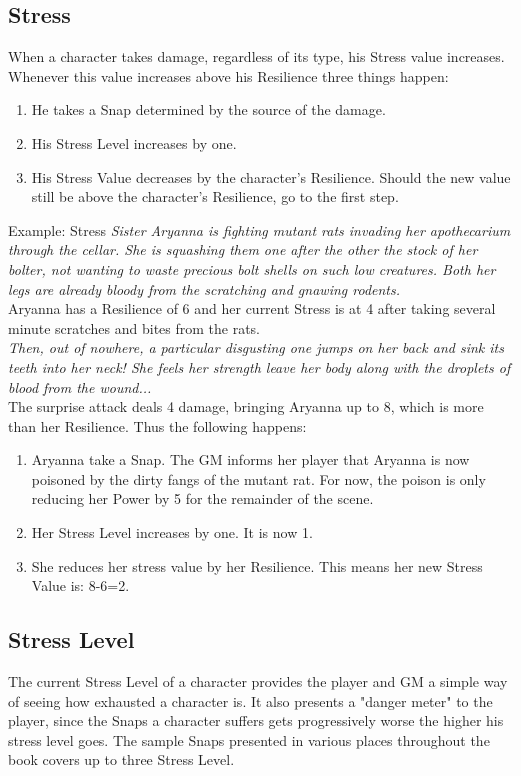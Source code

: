 \subsection{Stress}\label{Stress}
When a character takes damage, regardless of its type, his Stress value increases.
Whenever this value increases above his Resilience three things happen:
\begin{enumerate}
	\item He takes a Snap determined by the source of the damage.
	\item His Stress Level increases by one.
	\item His Stress Value decreases by the character's Resilience. Should the new value still be above the character's Resilience, go to the first step.
\end{enumerate}

\begin{DndSidebar}{Example: Stress}
\textit{Sister Aryanna is fighting mutant rats invading her apothecarium through the cellar. She is squashing them one after the other the stock of her bolter, not wanting to waste precious bolt shells on such low creatures. Both her legs are already bloody from the scratching and gnawing rodents.}\\
\noindent
Aryanna has a Resilience of 6 and her current Stress is at 4 after taking several minute scratches and bites from the rats.\\
\noindent
\textit{Then, out of nowhere, a particular disgusting one jumps on her back and sink its teeth into her neck! She feels her strength leave her body along with the droplets of blood from the wound...}\\
\noindent
The surprise attack deals 4 damage, bringing Aryanna up to 8, which is more than her Resilience. 
Thus the following happens:
\begin{enumerate}
	\item Aryanna take a Snap. The GM informs her player that Aryanna is now poisoned by the dirty fangs of the mutant rat. For now, the poison is only reducing her Power by 5 for the remainder of the scene.
	\item Her Stress Level increases by one. It is now 1.
	\item She reduces her stress value by her Resilience. This means her new Stress Value is: 8-6=2.
\end{enumerate}
\end{DndSidebar}

\subsection{Stress Level}\label{Stress_Level}
The current Stress Level of a character provides the player and GM a simple way of seeing how exhausted a character is.
It also presents a "danger meter" to the player, since the Snaps a character suffers gets progressively worse the higher his stress level goes.
The sample Snaps presented in various places throughout the book covers up to three Stress Level.

